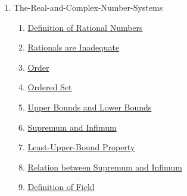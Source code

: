 \clearpage
\renewcommand{\notetitle}{Table of Contents}
\label{toc}
\begin{enumerate}

\item The-Real-and-Complex-Number-Systems
\begin{enumerate}
\item \hyperref[202501131947]{Definition of Rational Numbers}
\item \hyperref[202501132004]{Rationals are Inadequate}
\item \hyperref[202501141228]{Order}
\item \hyperref[202501141241]{Ordered Set}
\item \hyperref[202501141250]{Upper Bounds and Lower Bounds}
\item \hyperref[202501141546]{Supremum and Infimum}
\item \hyperref[202501141632]{Least-Upper-Bound Property}
\item \hyperref[202501141654]{Relation between Supremum and Infimum}
\item \hyperref[202501150657]{Definition of Field}
\end{enumerate}
\end{enumerate}

\newpage
